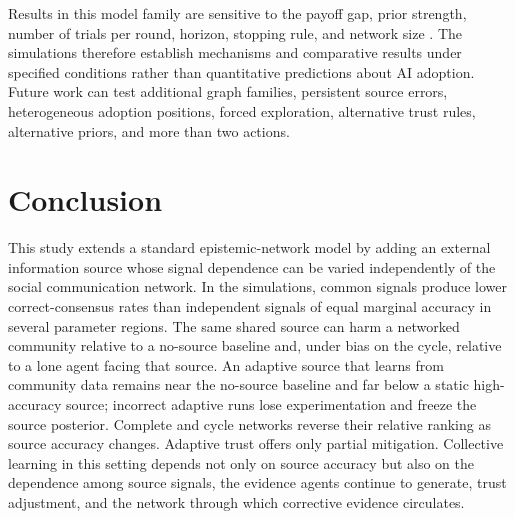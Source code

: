 \documentclass[10pt,letterpaper,twocolumn]{article}
\begin{document}
Results in this model family are sensitive to the payoff gap, prior strength, number of trials per round, horizon, stopping rule, and network size \citep{rosenstock2017}. The simulations therefore establish mechanisms and comparative results under specified conditions rather than quantitative predictions about AI adoption. Future work can test additional graph families, persistent source errors, heterogeneous adoption positions, forced exploration, alternative trust rules, alternative priors, and more than two actions.

\section{Conclusion}
\label{sec:conclusion}

\balance
This study extends a standard epistemic-network model by adding an external information source whose signal dependence can be varied independently of the social communication network. In the simulations, common signals produce lower correct-consensus rates than independent signals of equal marginal accuracy in several parameter regions. The same shared source can harm a networked community relative to a no-source baseline and, under bias on the cycle, relative to a lone agent facing that source. An adaptive source that learns from community data remains near the no-source baseline and far below a static high-accuracy source; incorrect adaptive runs lose experimentation and freeze the source posterior. Complete and cycle networks reverse their relative ranking as source accuracy changes. Adaptive trust offers only partial mitigation. Collective learning in this setting depends not only on source accuracy but also on the dependence among source signals, the evidence agents continue to generate, trust adjustment, and the network through which corrective evidence circulates.
\end{document}
